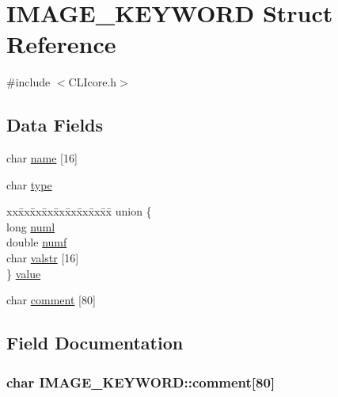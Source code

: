 \hypertarget{structIMAGE__KEYWORD}{}\section{I\+M\+A\+G\+E\+\_\+\+K\+E\+Y\+W\+O\+R\+D Struct Reference}
\label{structIMAGE__KEYWORD}


{\ttfamily \#include $<$C\+L\+Icore.\+h$>$}

\subsection*{Data Fields}
\begin{DoxyCompactItemize}
\item 
char \hyperlink{structIMAGE__KEYWORD_aa0fef8b5fce4b24d792d0fc01df9dd8a}{name} \mbox{[}16\mbox{]}
\item 
char \hyperlink{structIMAGE__KEYWORD_a93acc5dd5d573d8e91129b27332e4ef4}{type}
\item 
\begin{tabbing}
xx\=xx\=xx\=xx\=xx\=xx\=xx\=xx\=xx\=\kill
union \{\\
\>long \hyperlink{structIMAGE__KEYWORD_a6b685359dddb142ca90215549108055d}{numl}\\
\>double \hyperlink{structIMAGE__KEYWORD_ac90e9ede78d5bc3173c2a0adc0a5b0c5}{numf}\\
\>char \hyperlink{structIMAGE__KEYWORD_a148ed6e2cddc70400b2692efbdd23280}{valstr} \mbox{[}16\mbox{]}\\
\} \hyperlink{structIMAGE__KEYWORD_a93da8b101ca9f8e620803c6e39316b0e}{value}\\

\end{tabbing}\item 
char \hyperlink{structIMAGE__KEYWORD_a3ace85ee9471c3170cf09ba95c5dda07}{comment} \mbox{[}80\mbox{]}
\end{DoxyCompactItemize}


\subsection{Field Documentation}
\hypertarget{structIMAGE__KEYWORD_a3ace85ee9471c3170cf09ba95c5dda07}{}
\subsubsection[{comment}]{\setlength{\rightskip}{0pt plus 5cm}char I\+M\+A\+G\+E\+\_\+\+K\+E\+Y\+W\+O\+R\+D\+::comment\mbox{[}80\mbox{]}}\label{structIMAGE__KEYWORD_a3ace85ee9471c3170cf09ba95c5dda07}
\hypertarget{structIMAGE__KEYWORD_aa0fef8b5fce4b24d792d0fc01df9dd8a}{}
